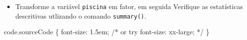 \documentclass[
  letterpaper,
  DIV=11,
  numbers=noendperiod]{scrartcl}
\newenvironment{Shaded}{\begin{snugshade}}{\end{snugshade}}
\newcommand{\CharTok}[1]{\textcolor[rgb]{0.13,0.47,0.30}{#1}}
\newcommand{\CommentTok}[1]{\textcolor[rgb]{0.37,0.37,0.37}{#1}}
\newcommand{\DataTypeTok}[1]{\textcolor[rgb]{0.68,0.00,0.00}{#1}}
\newcommand{\DecValTok}[1]{\textcolor[rgb]{0.68,0.00,0.00}{#1}}
\newcommand{\FunctionTok}[1]{\textcolor[rgb]{0.28,0.35,0.67}{#1}}
\newcommand{\KeywordTok}[1]{\textcolor[rgb]{0.00,0.23,0.31}{#1}}
\newcommand{\NormalTok}[1]{\textcolor[rgb]{0.00,0.23,0.31}{#1}}
\newcommand{\OperatorTok}[1]{\textcolor[rgb]{0.37,0.37,0.37}{#1}}
\newcommand{\OtherTok}[1]{\textcolor[rgb]{0.00,0.23,0.31}{#1}}
\newcommand{\SpecialCharTok}[1]{\textcolor[rgb]{0.37,0.37,0.37}{#1}}
\providecommand{\tightlist}{%
  \setlength{\itemsep}{0pt}\setlength{\parskip}{0pt}}\usepackage{longtable,booktabs,array}
\begin{document}
\begin{itemize}
\tightlist
\item
  Transforme a variável \texttt{piscina} em fator, em seguida Verifique
  as estatísticas descritivas utlizando o comando \texttt{summary()}.
\end{itemize}

\begin{Shaded}
\end{Shaded}

\begin{Shaded}
\begin{Highlighting}[]
\NormalTok{code}\FunctionTok{.sourceCode}\NormalTok{ \{}
  \KeywordTok{font{-}size}\CharTok{:} \DecValTok{1.5}\DataTypeTok{em}\OperatorTok{;}
  \CommentTok{/* or try font{-}size: xx{-}large; */}
\NormalTok{\}}
\end{Highlighting}
\end{Shaded}
\end{document}
